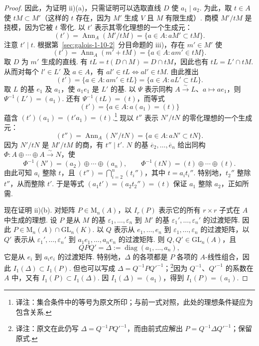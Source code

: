 \begin{proof}
\enlargethispage{2pt}
因此，为证明 ii)(a)，只需证明可以选取直线 $D$ 使 $a_1\mid a_2$. 为此，取 $t\in A$ 使 $tM\subset M'$（这样的 $t$ 存在，因为 $M'$ 生成 $V$ 且 $M$ 有限生成）. 商模 $M'/tM$ 是挠模，因为它被 $t$ 零化. 以 $t'$ 表示其零化理想的一个生成元：
\[(t')=\operatorname{Ann}_A(M'/tM)=\{a\in A:aM'\subset tM\}.\]
注意 $t'\mid t$. 根据第~\ref{sec:galois-1-10-2}~分目命题的 iii)，存在 $m'\in M'$ 使
\[(t')=\operatorname{Ann}_A(m'+tM)=\{a\in A:am'\in tM\}.\]
取 $D$ 为 $m'$ 生成的直线. 有 $tL=t(D\cap M)=D\cap tM$，因此也有 $tL=L'\cap tM$. 从而对每个 $l'\in L'$ 及 $a\in A$，有 $al'\in tL\Longleftrightarrow al'\in tM$. 由此推出
\[(t')=\{a\in A:am'\in tL\}=\{a\in A:aL'\subset tL\}.\]
取 $L$ 的基 $e_1$ 及 $a_1$，使 $a_1e_1$ 是 $L'$ 的基. 以 $\Psi$ 表示同构 $A\xrightarrow{\sim}L$、$a\mapsto ae_1$，则 $\Psi^{-1}(L')=(a_1)$. 还有 $\Psi^{-1}(tL)=(t)$，而等式
\[(t')=\{a\in A:a(a_1)=(t)\}\]
蕴含 $(t')(a_1)=(t'a_1)=(t)$.\footnote{译注：集合条件中的等号为原文所印；与前一式对照，此处的理想条件疑应为包含关系.}
现以 $t''$ 表示 $N'/tN$ 的零化理想的一个生成元：
\[(t'')=\operatorname{Ann}_A(N'/tN)=\{a\in A:aN'\subset tN\}.\]
因为 $N'/tN$ 是 $M'/tM$ 的商，有 $t''\mid t'$. $N$ 的基 $\overline e_2,\ldots,\overline e_n$ 给出同构 $\Phi\colon A\oplus\cdots\oplus A\xrightarrow{\sim}N$，使
\[\Phi^{-1}(N')=(a_2)\oplus\cdots\oplus(a_n),\qquad \Phi^{-1}(tN)=(t)\oplus\cdots\oplus(t).\]
由此可知 $a_i$ 整除 $t$，且 $(t'')=\bigcap_{i=2}^n(t_i'')$，其中 $t=a_it_i''$. 特别地，$t_2''$ 整除 $t''$，从而整除 $t'$. 于是等式 $(a_1t')=(a_2t_2'')=(t)$ 保证 $a_1$ 整除 $a_2$，正如所需.

现在证明 ii)(b). 对矩阵 $P\in\mathrm M_n(A)$，以 $I_r(P)$ 表示它的所有 $r\times r$ 子式在 $A$ 中生成的理想. 设 $P$ 是从 $M$ 的基 $\varepsilon_1,\ldots,\varepsilon_n$ 到 $M'$ 的基 $\varepsilon_1',\ldots,\varepsilon_n'$ 的过渡矩阵. 因此 $P\in\mathrm M_n(A)\cap\mathrm{GL}_n(K)$. 以 $Q$ 表示从 $e_1,\ldots,e_n$ 到 $\varepsilon_1,\ldots,\varepsilon_n$ 的过渡矩阵，以 $Q'$ 表示从 $\varepsilon_1',\ldots,\varepsilon_n'$ 到 $a_1e_1,\ldots,a_ne_n$ 的过渡矩阵. 则 $Q,Q'\in\mathrm{GL}_n(A)$，且
\[QPQ'=\Delta:=\operatorname{diag}(a_1,\ldots,a_n),\]
它是从 $e_i$ 到 $a_ie_i$ 的过渡矩阵. 特别地，$\Delta$ 的各项都是 $P$ 各项的 $A$-线性组合，因此 $I_1(\Delta)\subset I_1(P)$. 但也可以写成 $\Delta=Q^{-1}PQ'^{-1}$；\footnote{译注：原文在此仍写 $\Delta=Q^{-1}PQ'^{-1}$，而由前式应解出 $P=Q^{-1}\Delta Q'^{-1}$；保留原式.}因为 $Q^{-1}$、$Q'^{-1}$ 的系数在 $A$ 中，又有 $I_1(P)\subset I_1(\Delta)$. 因 $I_1(\Delta)=(a_1)$，得到 $I_1(P)=(a_1)$.


\end{proof}
